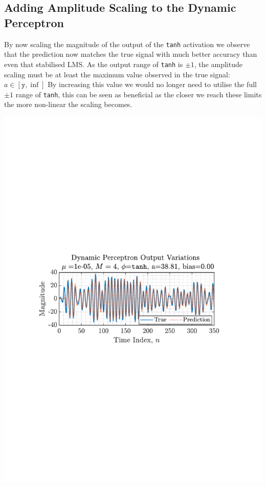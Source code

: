 \documentclass[12pt]{article}
\numberwithin{equation}{section}
\begin{document}
	\subsection{Adding Amplitude Scaling to the Dynamic Perceptron} \label{sec: 4-3-amplitude-dynamic-perc}
		\begin{minipage}[b]{0.49\textwidth}
			By now scaling the magnitude of the output of the \texttt{tanh} activation we observe that the prediction now matches the true signal with much better accuracy than even that stabilised LMS. As the output range of \texttt{tanh} is $\pm1$, the amplitude scaling must be at least the maximum value observed in the true signal: $a\in[\texttt{y},\inf]$ By increasing this value we would no longer need to utilise the full $\pm1$ range of \texttt{tanh}, this can be seen as beneficial as the closer we reach these limits the more non-linear the scaling becomes.
		\end{minipage}%
		\begin{minipage}{0.04\textwidth}
			\hspace*{0.04\textwidth}
		\end{minipage}%
		\begin{minipage}[b]{0.49\textwidth}
			\centering
			\includegraphics[trim={2.2cm 11.2cm 3.15cm  11.2cm}, clip, width=\textwidth]{../MATLAB/figures/q4_3_fig01.pdf} 
			\captionsetup{justification=centering}
			\label{fig: 4-3}
		\end{minipage}%
	
\end{document}
